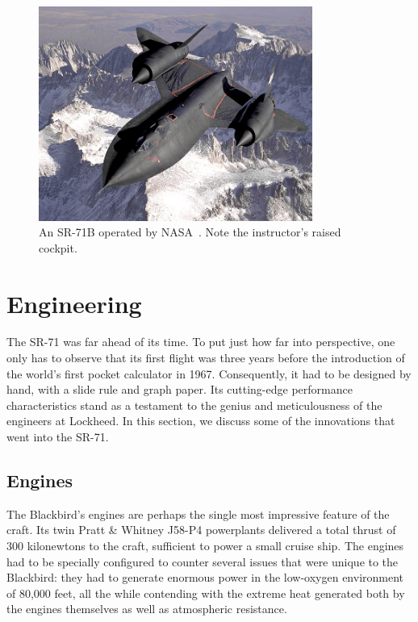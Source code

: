 \documentclass[12pt, draftclsnofoot, onecolumn]{IEEEtran}
\begin{document}
\begin{figure}[h]
	\centering
	\includegraphics[width=0.8\textwidth]{sr71b.jpg}
	\caption{An SR-71B operated by NASA~\cite{dryden}. Note the instructor's raised cockpit.}
\end{figure}

	
\section{Engineering}

The SR-71 was far ahead of its time. To put just how far into perspective, one only has to observe that its first flight was three years before the introduction of the world's first pocket calculator in 1967. Consequently, it had to be designed by hand, with a slide rule and graph paper. Its cutting-edge performance characteristics stand as a testament to the genius and meticulousness of the engineers at Lockheed. In this section, we discuss some of the innovations that went into the SR-71.

	\subsection*{Engines}
	The Blackbird's engines are perhaps the single most impressive feature of the craft. Its twin Pratt \& Whitney J58-P4 powerplants delivered a total thrust of 300 kilonewtons\cite{engines} to the craft, sufficient to power a small cruise ship. The engines had to be specially configured to counter several issues that were unique to the Blackbird: they had to generate enormous power in the low-oxygen environment of 80,000 feet, all the while contending with the extreme heat generated both by the engines themselves as well as atmospheric resistance.
	
\end{document}
